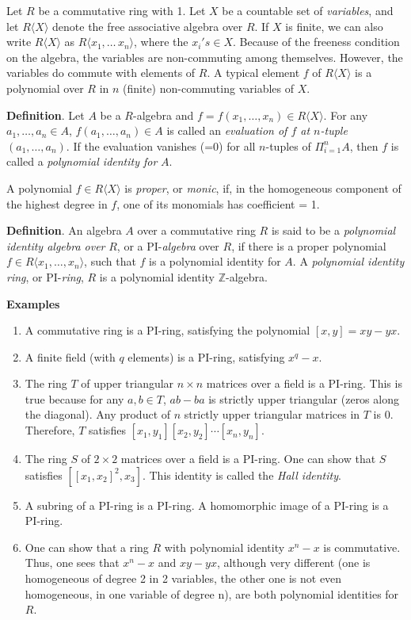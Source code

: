 \documentclass[12pt]{article}
\begin{document}
Let $R$ be a commutative ring with 1.  Let $X$ be a countable set of \emph{variables}, and let $R \langle X \rangle$ denote the free associative algebra over $R$.  If $X$ is finite, we can also write $R \langle X \rangle$ as $R \langle x_1, \ldots\, x_n \rangle$, where the $x_i's \in X$.  Because of the freeness condition on the algebra, the variables are non-commuting among themselves.  However, the variables do commute with elements of $R$.  A typical element $f$ of $R\langle X\rangle$ is a polynomial over $R$ in $n$ (finite) non-commuting variables of $X$.

\textbf{Definition}.  Let $A$ be a $R$-algebra and $f=f(x_1,\ldots,x_n)\in R\langle X\rangle$.  For any $a_1,\ldots,a_n\in A$, $f(a_1,\ldots,a_n)\in A$ is called an \emph{evaluation of $f$ at $n$-tuple $(a_1,\ldots,a_n)$}. If the evaluation vanishes (=0) for all $n$-tuples of $\Pi_{i=1}^{n}A$, then $f$ is called a \emph{polynomial identity for} $A$.

A polynomial $f\in R\langle X\rangle$ is \emph{proper}, or \emph{monic}, if, in the homogeneous component of the highest degree in $f$, one of its monomials has coefficient = 1.

\textbf{Definition}.  An algebra $A$ over a commutative ring $R$ is said to be a \emph{polynomial identity algebra over} $R$, or a PI-\emph{algebra} over $R$, if there is a proper polynomial $f \in R \langle x_1, \ldots, x_n \rangle$, such that $f$ is a polynomial identity for $A$.  A \emph{polynomial identity ring}, or PI-\emph{ring}, $R$ is a polynomial identity $\mathbb{Z}$-algebra.

\textbf{Examples}
\begin{enumerate}
\item
A commutative ring is a PI-ring, satisfying the polynomial $[x,y]=xy-yx$.
\item
A finite field (with $q$ elements) is a PI-ring, satisfying $x^q-x$.
\item
The ring $T$ of upper triangular $n \times n$ matrices over a field is a PI-ring.  This is true because for any $a, b\in T$, $ab-ba$ is strictly upper triangular (zeros along the diagonal).  Any product of $n$ strictly upper triangular matrices in $T$ is 0.  Therefore, $T$ satisfies $[x_1,y_1][x_2,y_2]\cdots [x_n,y_n]$.
\item
The ring $S$ of $2\times2$ matrices over a field is a PI-ring.  One can show that $S$ satisfies $[[x_1,x_2]^2,x_3]$.  This identity is called the \emph{Hall identity}.
\item
A subring of a PI-ring is a PI-ring.  A homomorphic image of a PI-ring is a PI-ring.
\item
One can show that a ring $R$ with polynomial identity $x^n-x$ is commutative.  Thus, one sees that $x^n-x$ and $xy-yx$, although very different (one is homogeneous of degree 2 in 2 variables, the other one is not even homogeneous, in one variable of degree n), are both polynomial identities for $R$.
\end{enumerate}
\end{document}
